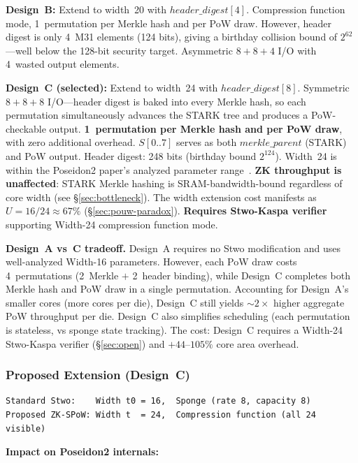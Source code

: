 \documentclass[11pt,a4paper]{article}
\begin{document}
\textbf{Design~B:} Extend to width~20 with $\mathit{header\_digest}[4]$. Compression function mode, 1~permutation per Merkle hash and per PoW draw. However, header digest is only 4~M31 elements (124 bits), giving a birthday collision bound of $2^{62}$---well below the 128-bit security target. Asymmetric $8{+}8{+}4$ I/O with 4~wasted output elements.

\textbf{Design~C (selected):} Extend to width~24 with $\mathit{header\_digest}[8]$. Symmetric $8{+}8{+}8$ I/O---header digest is baked into every Merkle hash, so each permutation simultaneously advances the STARK tree and produces a PoW-checkable output. \textbf{1~permutation per Merkle hash and per PoW draw}, with zero additional overhead. $S[0..7]$ serves as both $\mathit{merkle\_parent}$ (STARK) and PoW output. Header digest: 248 bits (birthday bound $2^{124}$). Width~24 is within the Poseidon2 paper's analyzed parameter range~\cite{poseidon2}. \textbf{ZK throughput is unaffected}: STARK Merkle hashing is SRAM-bandwidth-bound regardless of core width (see \S\ref{sec:bottleneck}). The width extension cost manifests as $U = 16/24 \approx 67\%$ (\S\ref{sec:pouw-paradox}). \textbf{Requires Stwo-Kaspa verifier} supporting Width-24 compression function mode.

\textbf{Design~A vs~C tradeoff.} Design~A requires no Stwo modification and uses well-analyzed Width-16 parameters. However, each PoW draw costs 4~permutations (2~Merkle $+$ 2~header binding), while Design~C completes both Merkle hash and PoW draw in a single permutation. Accounting for Design~A's smaller cores (more cores per die), Design~C still yields ${\sim}2\times$ higher aggregate PoW throughput per die. Design~C also simplifies scheduling (each permutation is stateless, vs sponge state tracking). The cost: Design~C requires a Width-24 Stwo-Kaspa verifier (\S\ref{sec:open}) and $+44$--$105\%$ core area overhead.

\subsubsection{Proposed Extension (Design~C)}
\label{sec:design-c}

\begin{Verbatim}[fontsize=\small]
Standard Stwo:    Width t0 = 16,  Sponge (rate 8, capacity 8)
Proposed ZK-SPoW: Width t  = 24,  Compression function (all 24 visible)
\end{Verbatim}

\textbf{Impact on Poseidon2 internals:}
\end{document}
